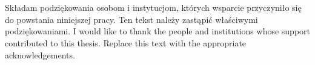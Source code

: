 \cleardoublepage
\chapter*{}
{}

\ploren
  {Składam podziękowania osobom i instytucjom, których wsparcie przyczyniło się do powstania niniejszej pracy. Ten tekst należy zastąpić właściwymi podziękowaniami.}
  {I would like to thank the people and institutions whose support contributed to this thesis. Replace this text with the appropriate acknowledgements.}
